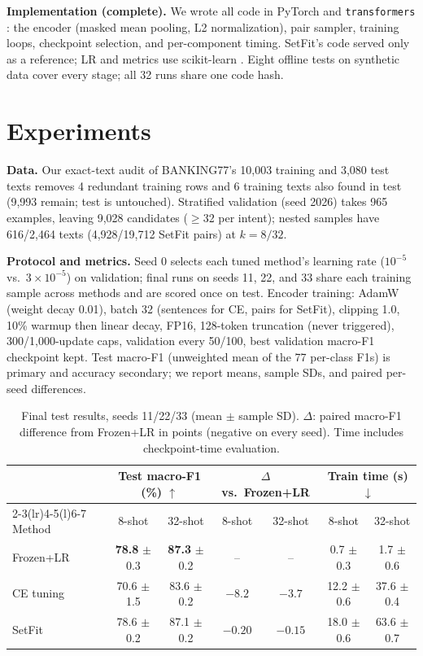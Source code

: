 \documentclass{article}
\begin{document}
\textbf{Implementation (complete).} We wrote all code in PyTorch \citep{paszke2019pytorch} and \texttt{transformers} \citep{wolf2020transformers}: the encoder (masked mean pooling, L2 normalization), pair sampler, training loops, checkpoint selection, and per-component timing. SetFit's code \citep{setfit2026} served only as a reference; LR and metrics use scikit-learn \citep{pedregosa2011scikit}. Eight offline tests on synthetic data cover every stage; all 32 runs share one code hash.

\section{Experiments}
\textbf{Data.} Our exact-text audit of BANKING77's 10,003 training and 3,080 test texts \citep{casanueva2020efficient,polyai2020banking77} removes 4 redundant training rows and 6 training texts also found in test (9,993 remain; test is untouched). Stratified validation (seed 2026) takes 965 examples, leaving 9,028 candidates ($\geq$32 per intent); nested samples have 616/2,464 texts (4,928/19,712 SetFit pairs) at $k=8/32$.

\textbf{Protocol and metrics.} Seed 0 selects each tuned method's learning rate ($10^{-5}$ vs.\ $3\times10^{-5}$) on validation; final runs on seeds 11, 22, and 33 share each training sample across methods and are scored once on test. Encoder training: AdamW (weight decay 0.01), batch 32 (sentences for CE, pairs for SetFit), clipping 1.0, 10\% warmup then linear decay, FP16, 128-token truncation (never triggered), 300/1,000-update caps, validation every 50/100, best validation macro-F1 checkpoint kept. Test macro-F1 (unweighted mean of the 77 per-class F1s) is primary and accuracy secondary; we report means, sample SDs, and paired per-seed differences.

\begin{table}[H]
\centering
\caption{Final test results, seeds 11/22/33 (mean $\pm$ sample SD). $\Delta$: paired macro-F1 difference from Frozen+LR in points (negative on every seed). Time includes checkpoint-time evaluation.}
\label{tab:models}
\small
\begin{tabular}{@{}lcccccc@{}}
\toprule
& \multicolumn{2}{c}{Test macro-F1 (\%) $\uparrow$} & \multicolumn{2}{c}{$\Delta$ vs.\ Frozen+LR} & \multicolumn{2}{c}{Train time (s) $\downarrow$} \\
\cmidrule(lr){2-3}\cmidrule(lr){4-5}\cmidrule(l){6-7}
Method & 8-shot & 32-shot & 8-shot & 32-shot & 8-shot & 32-shot \\
\midrule
Frozen+LR & \textbf{78.8} $\pm$ 0.3 & \textbf{87.3} $\pm$ 0.2 & -- & -- & 0.7 $\pm$ 0.3 & 1.7 $\pm$ 0.6 \\
CE tuning & 70.6 $\pm$ 1.5 & 83.6 $\pm$ 0.2 & $-8.2$ & $-3.7$ & 12.2 $\pm$ 0.6 & 37.6 $\pm$ 0.4 \\
SetFit & 78.6 $\pm$ 0.2 & 87.1 $\pm$ 0.2 & $-0.20$ & $-0.15$ & 18.0 $\pm$ 0.6 & 63.6 $\pm$ 0.7 \\
\bottomrule
\end{tabular}
\end{table}
\end{document}
